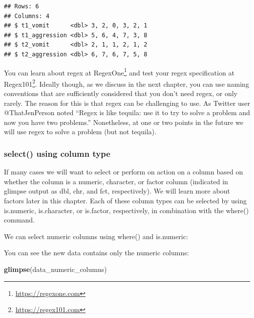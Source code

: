 \documentclass[
]{krantz}
\makeatletter
\newenvironment{Shaded}{\begin{snugshade}}{\end{snugshade}}
\newcommand{\KeywordTok}[1]{\textcolor[rgb]{0.27,0.27,0.27}{\textbf{#1}}}
\newcommand{\NormalTok}[1]{#1}
\newcommand{\OperatorTok}[1]{\textcolor[rgb]{0.43,0.43,0.43}{\textbf{#1}}}
\newcommand{\StringTok}[1]{\textcolor[rgb]{0.5,0.5,0.5}{#1}}
\renewcommand{\href}[2]{#2\footnote{\url{#1}}}
\newenvironment{kframe}{%
\medskip{}
\setlength{\fboxsep}{.8em}
 \def\at@end@of@kframe{}%
 \ifinner\ifhmode%
  \def\at@end@of@kframe{\end{minipage}}%
  \begin{minipage}{\columnwidth}%
 \fi\fi%
 \def\FrameCommand##1{\hskip\@totalleftmargin \hskip-\fboxsep
 \colorbox{shadecolor}{##1}\hskip-\fboxsep
     \hskip-\linewidth \hskip-\@totalleftmargin \hskip\columnwidth}%
 \MakeFramed {\advance\hsize-\width
   \@totalleftmargin\z@ \linewidth\hsize
   \@setminipage}}%
 {\par\unskip\endMakeFramed%
 \at@end@of@kframe}
\renewenvironment{Shaded}{\begin{kframe}}{\end{kframe}}
\makeatother
\begin{document}
\begin{verbatim}
## Rows: 6
## Columns: 4
## $ t1_vomit      <dbl> 3, 2, 0, 3, 2, 1
## $ t1_aggression <dbl> 5, 6, 4, 7, 3, 8
## $ t2_vomit      <dbl> 2, 1, 1, 2, 1, 2
## $ t2_aggression <dbl> 6, 7, 6, 7, 5, 8
\end{verbatim}

You can learn about regex at \href{https://regexone.com}{RegexOne} and test your regex specification at \href{https://regex101.com}{Regex101}. Ideally though, as we discuss in the next chapter, you can use naming conventions that are sufficiently considered that you don't need regex, or only rarely. The reason for this is that regex can be challenging to use. As Twitter user @ThatJenPerson noted ``Regex is like tequila: use it to try to solve a problem and now you have two problems.'' Nonetheless, at one or two points in the future we will use regex to solve a problem (but not tequila).

\hypertarget{select-using-column-type}{%
\subsubsection{select() using column type}\label{select-using-column-type}}

If many cases we will want to select or perform on action on a column based on whether the column is a numeric, character, or factor column (indicated in glimpse output as dbl, chr, and fct, respectively). We will learn more about factors later in this chapter. Each of these column types can be selected by using is.numeric, is.character, or is.factor, respectively, in combination with the where() command.

We can select numeric columns using where() and is.numeric:

\begin{Shaded}
\end{Shaded}

You can see the new data contains only the numeric columns:

\begin{Shaded}
\begin{Highlighting}[]
\KeywordTok{glimpse}\NormalTok{(data_numeric_columns)}
\end{Highlighting}
\end{Shaded}
\end{document}
